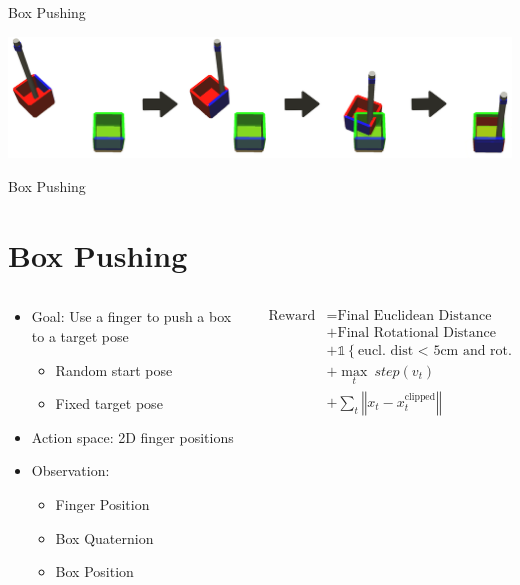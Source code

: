 \documentclass[16:9,en,navbarinfooter]{sdqbeamer}
\begin{document}
\begin{frame}{Box Pushing}

\includegraphics[width=.8\linewidth]{media/2dboxpushing}

\end{frame}
\begin{frame}{Box Pushing}
\section{Box Pushing}

\begin{columns}[t]
    \begin{column}{0.5\textwidth}
        \begin{itemize}
            \item Goal: Use a finger to push a box to a target pose
                \begin{itemize}
                    \item Random start pose
                    \item Fixed target pose
                \end{itemize}
            \item Action space: 2D finger positions
            \item Observation:
                \begin{itemize}
                    \item Finger Position
                    \item Box Quaternion
                    \item Box Position
                \end{itemize}
        \end{itemize}
            \vspace{1em}
    \end{column}
    \begin{column}{0.5\textwidth}
        $$
        \begin{aligned}
    \text{Reward} &= \text{Final Euclidean Distance} \\
             &+  \text{Final Rotational Distance} \\
             &+  \mathds{1} \left\{\text{eucl. dist < 5cm and rot. dist < .5rad}\right\} \\
             &+  \max_t\  step(v_t) \\
             &+  \sum_t \left\Vert x_t - x_t^\text{clipped} \right\Vert \\
        \end{aligned}
        $$
    \end{column}
\end{columns}
\end{frame}
\end{document}
